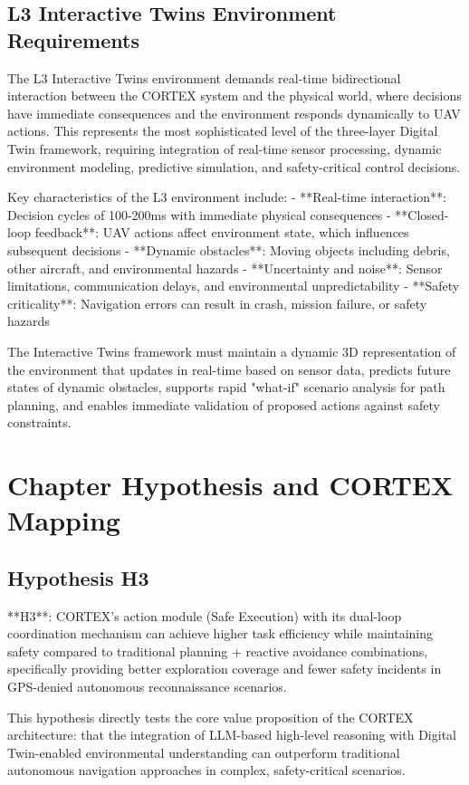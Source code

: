 \subsection{L3 Interactive Twins Environment Requirements}

The L3 Interactive Twins environment demands real-time bidirectional interaction between the CORTEX system and the physical world, where decisions have immediate consequences and the environment responds dynamically to UAV actions. This represents the most sophisticated level of the three-layer Digital Twin framework, requiring integration of real-time sensor processing, dynamic environment modeling, predictive simulation, and safety-critical control decisions.

Key characteristics of the L3 environment include:
- **Real-time interaction**: Decision cycles of 100-200ms with immediate physical consequences
- **Closed-loop feedback**: UAV actions affect environment state, which influences subsequent decisions
- **Dynamic obstacles**: Moving objects including debris, other aircraft, and environmental hazards
- **Uncertainty and noise**: Sensor limitations, communication delays, and environmental unpredictability
- **Safety criticality**: Navigation errors can result in crash, mission failure, or safety hazards

The Interactive Twins framework must maintain a dynamic 3D representation of the environment that updates in real-time based on sensor data, predicts future states of dynamic obstacles, supports rapid "what-if" scenario analysis for path planning, and enables immediate validation of proposed actions against safety constraints.

\section{Chapter Hypothesis and CORTEX Mapping}

\subsection{Hypothesis H3}

**H3**: CORTEX's action module (Safe Execution) with its dual-loop coordination mechanism can achieve higher task efficiency while maintaining safety compared to traditional planning + reactive avoidance combinations, specifically providing better exploration coverage and fewer safety incidents in GPS-denied autonomous reconnaissance scenarios.

This hypothesis directly tests the core value proposition of the CORTEX architecture: that the integration of LLM-based high-level reasoning with Digital Twin-enabled environmental understanding can outperform traditional autonomous navigation approaches in complex, safety-critical scenarios.

